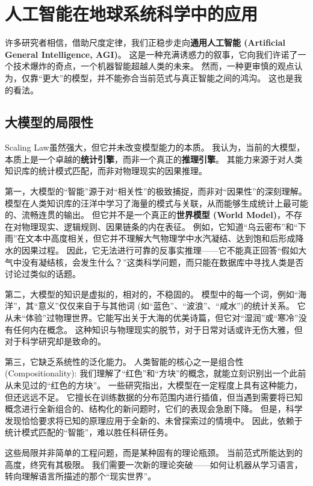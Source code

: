 \documentclass[12pt, a4paper]{article}
\begin{document}
\section{人工智能在地球系统科学中的应用}

许多研究者相信，借助尺度定律，我们正稳步走向\textbf{通用人工智能 (Artificial General Intelligence, AGI)}。
这是一种充满诱惑力的叙事，它向我们许诺了一个技术爆炸的奇点，一个机器智能超越人类的未来。
然而，一种更审慎的观点认为，仅靠“更大”的模型，并不能弥合当前范式与真正智能之间的鸿沟。
这也是我的看法。

\subsection{大模型的局限性}

Scaling Law虽然强大，但它并未改变模型能力的本质。
我认为，当前的大模型，本质上是一个卓越的\textbf{统计引擎}，而非一个真正的\textbf{推理引擎}。
其能力来源于对人类知识库的统计模式匹配，而非对物理现实的因果推理。

第一，大模型的“智能”源于对“相关性”的极致捕捉，而非对“因果性”的深刻理解。
模型在人类知识库的汪洋中学习了海量的模式与关联，从而能够生成统计上最可能的、流畅连贯的输出。
但它并不是一个真正的\textbf{世界模型 (World Model)}，不存在对物理现实、逻辑规则、因果链条的内在表征。
例如，它知道“乌云密布”和“下雨”在文本中高度相关，但它并不理解大气物理学中水汽凝结、达到饱和后形成降水的因果过程。
因此，它无法进行可靠的反事实推理——它不能真正回答“假如大气中没有凝结核，会发生什么？”这类科学问题，而只能在数据库中寻找人类是否讨论过类似的话题。

第二，大模型的知识是虚拟的，相对的，不稳固的。
模型中的每一个词，例如“海洋”，其“意义”仅仅来自于与其他词 (如“蓝色”、“波浪”、“咸水”)的统计关系。
它从未“体验”过物理世界。它能写出关于大海的优美诗篇，但它对“湿润”或“寒冷”没有任何内在概念。
这种知识与物理现实的脱节，对于日常对话或许无伤大雅，但对于科学研究却是致命的。

第三，它缺乏系统性的泛化能力。
人类智能的核心之一是组合性 (Compositionality): 我们理解了“红色”和“方块”的概念，就能立刻识别出一个此前从未见过的“红色的方块”。
一些研究指出，大模型在一定程度上具有这种能力，但还远远不足。
它擅长在训练数据的分布范围内进行插值，但当遇到需要将已知概念进行全新组合的、结构化的新问题时，它们的表现会急剧下降。
但是，科学发现恰恰要求将已知的原理应用于全新的、未曾探索过的情境中。
因此，依赖于统计模式匹配的“智能”，难以胜任科研任务。

这些局限并非简单的工程问题，而是某种固有的理论瓶颈。
当前范式所能达到的高度，终究有其极限。
我们需要一次新的理论突破——如何让机器从学习语言，转向理解语言所描述的那个“现实世界”。
\end{document}
